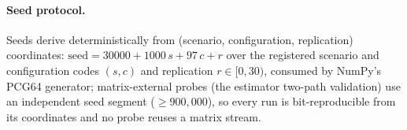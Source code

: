 \paragraph{Seed protocol.} Seeds derive deterministically from
(scenario, configuration, replication) coordinates:
$\mathrm{seed}=30000+1000\,s+97\,c+r$ over the registered scenario and
configuration codes $(s,c)$ and replication $r\in[0,30)$, consumed by
NumPy's PCG64 generator; matrix-external probes (the estimator two-path
validation) use an independent seed segment ($\ge900{,}000$), so every run
is bit-reproducible from its coordinates and no probe reuses a matrix
stream.
